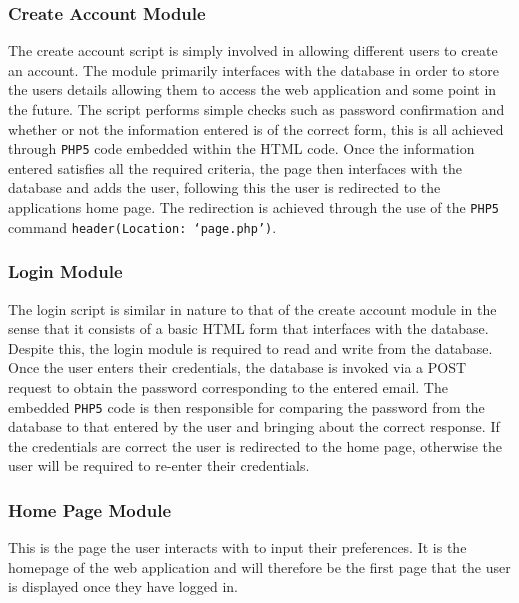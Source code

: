 \documentclass[10pt,twocolumn]{witseiepaper}
\begin{document}
		\subsubsection{Create Account Module}
		
		The create account script is simply involved in allowing different users to create an account. The module primarily interfaces with the database in order to store the users details allowing them to access the web application and some point in the future. The script performs simple checks such as password confirmation and whether or not the information entered is of the correct form, this is all achieved through \texttt{PHP5} code embedded within the HTML code. Once the information entered satisfies all the required criteria, the page then interfaces with the database and adds the user, following this the user is redirected to the applications home page. The redirection is achieved through the use of the \texttt{PHP5} command \texttt{header(Location: `page.php')}. 
		
		\subsubsection{Login Module}
		
		The login script is similar in nature to that of the create account module in the sense that it consists of a basic HTML form that interfaces with the database. Despite this, the login module is required to read and write from the database. \\
		
		Once the user enters their credentials, the database is invoked via a POST request to obtain the password corresponding to the entered email. The embedded \texttt{PHP5} code is then responsible for comparing the password from the database to that entered by the user and bringing about the correct response. If the credentials are correct the user is redirected to the home page, otherwise the user will be required to re-enter their credentials.
		
		\subsubsection{Home Page Module}
		
		This is the page the user interacts with to input their preferences. It is the homepage of the web application and will therefore be the first page that the user is displayed once they have logged in.\\
		
\end{document}

